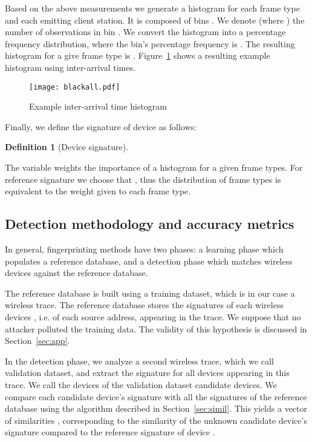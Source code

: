 \documentclass[10pt, conference, compsocconf, letterpaper]{IEEEtran}
\newtheorem{defn}{Definition}
\begin{document}
Based on the above measurements we generate a histogram for each frame type and each emitting client station.
It is composed of bins . We denote  (where ) the number of observations in bin .
We convert the histogram into a percentage frequency distribution, where the bin's  percentage frequency   
is . The resulting histogram for a give frame type is . Figure~\ref{fig:examplehisto} shows a resulting example histogram using inter-arrival times.

\begin{figure}
\begin{center}
\texttt{[image: blackall.pdf]}
\caption{Example inter-arrival time histogram}
\label{fig:examplehisto}
\end{center}
\end{figure}

Finally, we define the signature  of device  as follows:
\begin{defn}[Device signature]

\end{defn}
The variable  weights the importance of a histogram for a given frame types.
For reference signature we choose that , thus the distribution of frame types is equivalent to the weight given to each frame type.
 
  


 
 






\subsection{Detection methodology and accuracy metrics}
\label{ssec:detection}
In general, fingerprinting methods have two phases: a learning phase which populates a reference database, and a detection phase which matches wireless devices against the reference database.

The reference database is built using a training dataset, which is in our case a wireless trace.
The reference database stores the signatures  of each wireless devices , i.e. of each source address, appearing in the trace.
We suppose that no attacker polluted the training data.
The validity of this hypothesis is discussed in Section~\ref{sec:app}. 

In the detection phase, we analyze a second wireless trace, which we call validation dataset, 
and extract the signature  for all devices appearing in this trace. 
We call the devices of the validation dataset candidate devices. We compare
each candidate device's signature with all the signatures of the reference database using
the algorithm described in Section~\ref{sec:simil}. 
This yields a vector of similarities ,  corresponding 
to the similarity of the unknown candidate device's signature compared to the reference signature of device .
\end{document}

